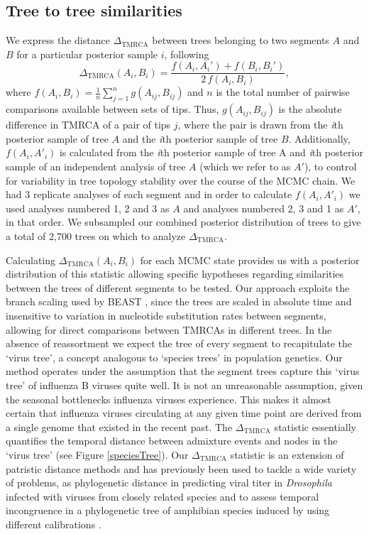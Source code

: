 \documentclass[11pt,oneside,letterpaper]{article}
\newcommand{\dtmrca}{\Delta_\mathrm{TMRCA}}
\begin{document}
\subsection*{Tree to tree similarities}
We express the distance $\dtmrca$ between trees belonging to two segments $A$ and $B$ for a particular posterior sample $i$, following
\begin{equation}
\dtmrca(A_i, B_i) = \frac{f(A_i, A_i') + f(B_i, B_i')}{2 \, f(A_i, B_i)},
\end{equation}
where $f(A_i, B_i) = \frac{1}{n}\sum_{j=1}^n g(A_{ij}, B_{ij})$ and $n$ is the total number of pairwise comparisons available between sets of tips.
Thus, $g(A_{ij},B_{ij})$ is the absolute difference in TMRCA of a pair of tips $j$, where the pair is drawn from the \textit{i}th posterior sample of tree $A$ and the \textit{i}th posterior sample of tree $B$.
Additionally, $f(A_i,A'_i)$ is calculated from the \textit{i}th posterior sample of tree A and \textit{i}th posterior sample of an independent analysis of tree $A$ (which we refer to as $A'$), to control for variability in tree topology stability over the course of the MCMC chain.
We had 3 replicate analyses of each segment and in order to calculate $f(A_i,A'_i)$ we used analyses numbered 1, 2 and 3 as $A$ and analyses numbered 2, 3 and 1 as $A'$, in that order.
We subsampled our combined posterior distribution of trees to give a total of 2,700 trees on which to analyze $\dtmrca$.

Calculating $\dtmrca(A_i, B_i)$ for each MCMC state provides us with a posterior distribution of this statistic allowing  specific hypotheses regarding similarities between the trees of different segments to be tested.
Our approach exploits the branch scaling used by BEAST \citep{drummond2012}, since the trees are scaled in absolute time and insensitive to variation in nucleotide substitution rates between segments, allowing for direct comparisons between TMRCAs in different trees.
In the absence of reassortment we expect the tree of every segment to recapitulate the `virus tree', a concept analogous to `species trees' in population genetics.
Our method operates under the assumption that the segment trees capture this `virus tree' of influenza B viruses quite well.
It is not an unreasonable assumption, given the seasonal bottlenecks influenza viruses experience.
This makes it almost certain that influenza viruses circulating at any given time point are derived from a single genome that existed in the recent past.
The $\dtmrca$ statistic essentially quantifies the temporal distance between admixture events and nodes in the `virus tree' (see Figure \ref{speciesTree}).
Our $\dtmrca$ statistic is an extension of patristic distance methods and has previously been used to tackle a wide variety of problems, as phylogenetic distance in predicting viral titer in \textit{Drosophila} infected with viruses from closely related species \citep{longdon2011} and to assess temporal incongruence in a phylogenetic tree of amphibian species induced by using different calibrations \citep{ruane2011}.
\end{document}
